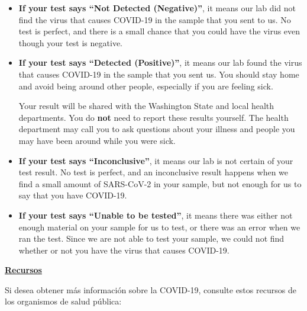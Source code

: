 \documentclass[10pt]{article}
\begin{document}
\begin{itemize}


\item

  \textbf{If your test says ``Not Detected (Negative)''}, it means our lab did not find the
  virus that causes COVID-19 in the sample that you sent to us. No test is
  perfect, and there is a small chance that you could have the virus even though
  your test is negative.

\item

  \textbf{If your test says ``Detected (Positive)''}, it means our
  lab found the virus that causes COVID-19 in the sample that you sent us. You
  should stay home and avoid being around other people, especially if you are
  feeling sick.

  Your result will be shared with the Washington State and local health
  departments. You do \textbf{not} need to report these results yourself. The
  health department may call you to ask questions about your illness and people
  you may have been around while you were sick.

\item

  \textbf{If your test says ``Inconclusive''}, it means our lab is not certain
  of your test result. No test is perfect, and an inconclusive result happens
  when we find a small amount of SARS-CoV-2 in your sample, but not enough for
  us to say that you have COVID-19.

\item

  \textbf{If your test says ``Unable to be tested''}, it means there was either
  not enough material on your sample for us to test, or there was an error when
  we ran the test. Since we are not able to test your sample, we could not find
  whether or not you have the virus that causes COVID-19.

\end{itemize}

\bigskip

\large \underline{\textbf{Recursos}}

Si desea obtener más información sobre la COVID-19, consulte estos recursos de
los organismos de salud pública:
\end{document}
